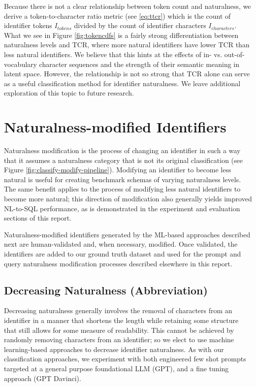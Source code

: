 Because there is not a clear relationship between token count and naturalness, we derive a token-to-character ratio metric (see \ref{eq:ttcr}) which is the count of identifier tokens $I_{tokens}$ divided by the count of identifier characters $I_{characters}$.
What we see in Figure \ref{fig:tokencdfs} is a fairly strong differentiation between naturalness levels and TCR, where more natural identifiers have lower TCR than less natural identifiers.
We believe that this hints at the effects of in- vs. out-of-vocabulary character sequences and the strength of their semantic meaning in latent space.
However, the relationship is not so strong that TCR alone can serve as a useful classification method for identifier naturalness.
We leave additional exploration of this topic to future research.



\section{Naturalness-modified Identifiers}


Naturalness modification is the process of changing an identifier in such a way that it assumes a naturalness category that is not its original classification (see Figure \ref{fig:classify-modify-pipeline}).
Modifying an identifier to become less natural is useful for creating benchmark schemas of varying naturalness levels.
The same benefit applies to the process of modifying less natural identifiers to become more natural; this direction of modification also generally yields improved NL-to-SQL performance, as is demonstrated in the experiment and evaluation sections of this report.

Naturalness-modified identifiers generated by the ML-based approaches described next are human-validated and, when necessary, modified.
Once validated, the identifiers are added to our ground truth dataset and used for the prompt and query naturalness modification processes described elsewhere in this report.

\subsection{Decreasing Naturalness (Abbreviation)}
Decreasing naturalness generally involves the removal of characters from an identifier in a manner that shortens the length while retaining some structure that still allows for some measure of readability.
This cannot be achieved by randomly removing characters from an identifier; so we elect to use machine learning-based approaches to decrease identifier naturalness.
As with our classification approaches, we experiment with both engineered few shot prompts targeted at a general purpose foundational LLM (GPT), and a fine tuning approach (GPT Davinci).

